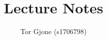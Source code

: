 \documentclass[a4paper,11pt,english]{article}
\title{\textbf{Lecture Notes}}
\author{Tor Gjone (s1706798)}
\begin{document}
\mmaketitle


\end{document}
